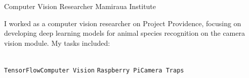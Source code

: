 \documentclass[10pt]{developercv} %
\begin{document}
\begin{entrylist}

  {Computer Vision Researcher}
  {Mamiraua Institute}
  {
    I worked as a computer vision researcher on Project Providence, focusing on
developing deep learning models for animal species recognition on the camera
vision module. My tasks included:\\
    \begin{contributionlist}
    \end{contributionlist}\\
\texttt{TensorFlow}\slashsep\texttt{Computer Vision}
\slashsep\texttt {Raspberry Pi}\slashsep\texttt{Camera Traps}}\\\\\\


\end{entrylist}
\end{document}

